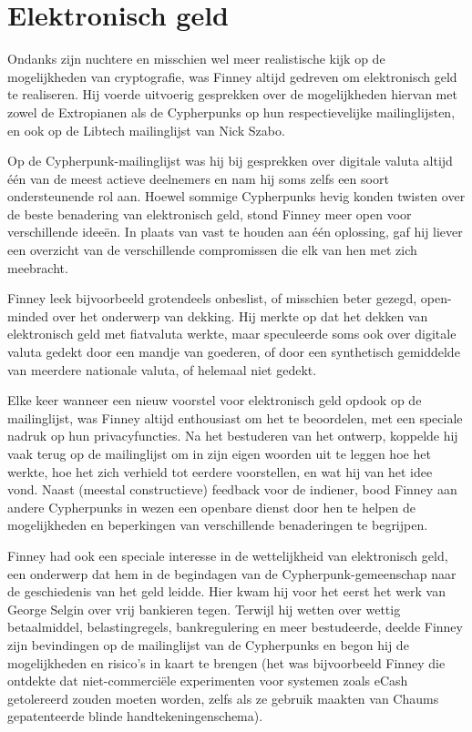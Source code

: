 \documentclass[
  a5paper,
  smalldemyvopaper,11pt,twoside,onecolumn,openright,extrafontsizes,
hidelinks]{memoir}
\begin{document}
\section{Elektronisch geld}\label{elektronisch-geld}

Ondanks zijn nuchtere en misschien wel meer realistische kijk op de
mogelijkheden van cryptografie, was Finney altijd gedreven om
elektronisch geld te realiseren. Hij voerde uitvoerig gesprekken over de
mogelijkheden hiervan met zowel de Extropianen als de Cypherpunks op hun
respectievelijke mailinglijsten, en ook op de Libtech mailinglijst van
Nick Szabo.

Op de Cypherpunk-mailinglijst was hij bij gesprekken over digitale
valuta altijd één van de meest actieve deelnemers en nam hij soms zelfs
een soort ondersteunende rol aan. Hoewel sommige Cypherpunks hevig
konden twisten over de beste benadering van elektronisch geld, stond
Finney meer open voor verschillende ideeën. In plaats van vast te houden
aan één oplossing, gaf hij liever een overzicht van de verschillende
compromissen die elk van hen met zich meebracht.

Finney leek bijvoorbeeld grotendeels onbeslist, of misschien beter
gezegd, open-minded over het onderwerp van dekking. Hij merkte op dat
het dekken van elektronisch geld met fiatvaluta werkte, maar speculeerde
soms ook over digitale valuta gedekt door een mandje van goederen, of
door een synthetisch gemiddelde van meerdere nationale valuta, of
helemaal niet gedekt.

Elke keer wanneer een nieuw voorstel voor elektronisch geld opdook op de
mailinglijst, was Finney altijd enthousiast om het te beoordelen, met
een speciale nadruk op hun privacyfuncties. Na het bestuderen van het
ontwerp, koppelde hij vaak terug op de mailinglijst om in zijn eigen
woorden uit te leggen hoe het werkte, hoe het zich verhield tot eerdere
voorstellen, en wat hij van het idee vond. Naast (meestal constructieve)
feedback voor de indiener, bood Finney aan andere Cypherpunks in wezen
een openbare dienst door hen te helpen de mogelijkheden en beperkingen
van verschillende benaderingen te begrijpen.

Finney had ook een speciale interesse in de wettelijkheid van
elektronisch geld, een onderwerp dat hem in de begindagen van de
Cypherpunk-gemeenschap naar de geschiedenis van het geld leidde. Hier
kwam hij voor het eerst het werk van George Selgin over vrij bankieren
tegen. Terwijl hij wetten over wettig betaalmiddel, belastingregels,
bankregulering en meer bestudeerde, deelde Finney zijn bevindingen op de
mailinglijst van de Cypherpunks en begon hij de mogelijkheden en
risico's in kaart te brengen (het was bijvoorbeeld Finney die ontdekte
dat niet-commerciële experimenten voor systemen zoals eCash getolereerd
zouden moeten worden, zelfs als ze gebruik maakten van Chaums
gepatenteerde blinde handtekeningenschema).
\end{document}
